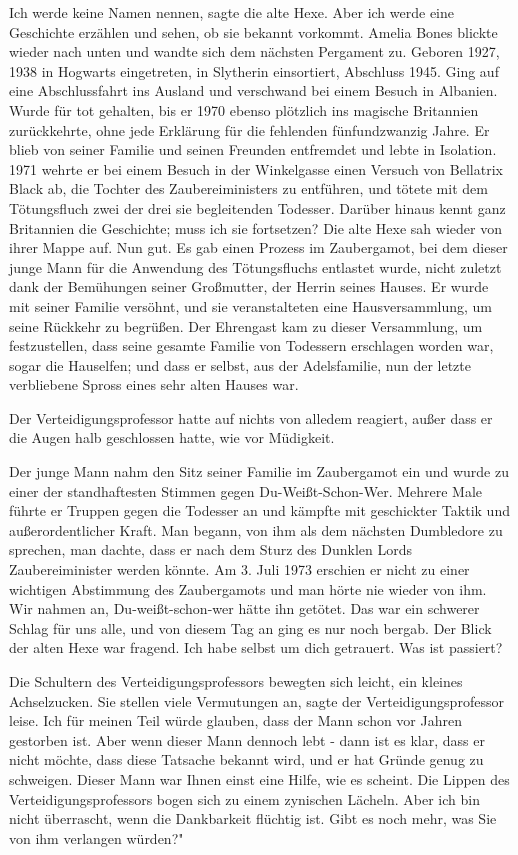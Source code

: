 \glqq Ich werde keine Namen nennen\grqq{}, sagte die alte Hexe. \glqq Aber ich
werde eine Geschichte erzählen und sehen, ob sie bekannt vorkommt.\grqq{} Amelia
Bones blickte wieder nach unten und wandte sich dem nächsten Pergament zu. \glqq
Geboren 1927, 1938 in Hogwarts eingetreten, in Slytherin einsortiert, Abschluss
1945. Ging auf eine Abschlussfahrt ins Ausland und verschwand bei einem Besuch
in Albanien. Wurde für tot gehalten, bis er 1970 ebenso plötzlich ins magische
Britannien zurückkehrte, ohne jede Erklärung für die fehlenden fünfundzwanzig
Jahre. Er blieb von seiner Familie und seinen Freunden entfremdet und lebte in
Isolation. 1971 wehrte er bei einem Besuch in der Winkelgasse einen Versuch von
Bellatrix Black ab, die Tochter des Zaubereiministers zu entführen, und tötete
mit dem Tötungsfluch zwei der drei sie begleitenden Todesser. Darüber hinaus
kennt ganz Britannien die Geschichte; muss ich sie fortsetzen?\grqq{} Die alte
Hexe sah wieder von ihrer Mappe auf. \glqq Nun gut. Es gab einen Prozess im
Zaubergamot, bei dem dieser junge Mann für die Anwendung des Tötungsfluchs
entlastet wurde, nicht zuletzt dank der Bemühungen seiner Großmutter, der Herrin
seines Hauses. Er wurde mit seiner Familie versöhnt, und sie veranstalteten eine
Hausversammlung, um seine Rückkehr zu begrüßen. Der Ehrengast kam zu dieser
Versammlung, um festzustellen, dass seine gesamte Familie von Todessern
erschlagen worden war, sogar die Hauselfen; und dass er selbst, aus der
Adelsfamilie, nun der letzte verbliebene Spross eines sehr alten Hauses
war.\grqq{}

Der Verteidigungsprofessor hatte auf nichts von alledem reagiert, außer dass er
die Augen halb geschlossen hatte, wie vor Müdigkeit.

\glqq Der junge Mann nahm den Sitz seiner Familie im Zaubergamot ein und wurde
zu einer der standhaftesten Stimmen gegen Du-Weißt-Schon-Wer. Mehrere Male
führte er Truppen gegen die Todesser an und kämpfte mit geschickter Taktik und
außerordentlicher Kraft. Man begann, von ihm als dem nächsten Dumbledore zu
sprechen, man dachte, dass er nach dem Sturz des Dunklen Lords Zaubereiminister
werden könnte. Am 3. Juli 1973 erschien er nicht zu einer wichtigen Abstimmung
des Zaubergamots und man hörte nie wieder von ihm. Wir nahmen an,
Du-weißt-schon-wer hätte ihn getötet. Das war ein schwerer Schlag für uns alle,
und von diesem Tag an ging es nur noch bergab.\grqq{} Der Blick der alten Hexe
war fragend. \glqq Ich habe selbst um dich getrauert. Was ist passiert?\grqq{}

Die Schultern des Verteidigungsprofessors bewegten sich leicht, ein kleines
Achselzucken. \glqq Sie stellen viele Vermutungen an\grqq{}, sagte der
Verteidigungsprofessor leise. \glqq Ich für meinen Teil würde glauben, dass der
Mann schon vor Jahren gestorben ist. Aber wenn dieser Mann dennoch lebt - dann
ist es klar, dass er nicht möchte, dass diese Tatsache bekannt wird, und er hat
Gründe genug zu schweigen. Dieser Mann war Ihnen einst eine Hilfe, wie es
scheint.\grqq{} Die Lippen des Verteidigungsprofessors bogen sich zu einem
zynischen Lächeln. \glqq Aber ich bin nicht überrascht, wenn die Dankbarkeit
flüchtig ist. Gibt es noch mehr, was Sie von ihm verlangen würden?"

